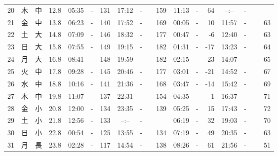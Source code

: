 \documentclass[12pt.a4j]{jsarticle}
\begin{document}
\begin{center}
\begin{table}[ht]
\begin{tabular}{|rc|cr|ccrccr|ccrccr|}
20 & 木 & 中 & 12.8 &  05:35 &-& 131  &  17:12 &-& 159  &   11:13 &-&  64  &   --:-- &-&~~~~~ \\
21 & 金 & 中 & 13.8 &  06:23 &-& 140  &  17:52 &-& 169  &   00:05 &-&  10  &   11:57 &-&  63  \\
22 & 土 & 大 & 14.8 &  07:09 &-& 146  &  18:32 &-& 177  &   00:47 &-&  -6  &   12:40 &-&  63  \\
23 & 日 & 大 & 15.8 &  07:55 &-& 149  &  19:15 &-& 182  &   01:31 &-& -17  &   13:23 &-&  64  \\
24 & 月 & 大 & 16.8 &  08:41 &-& 148  &  19:59 &-& 182  &   02:15 &-& -23  &   14:07 &-&  65  \\
25 & 火 & 中 & 17.8 &  09:28 &-& 145  &  20:46 &-& 177  &   03:01 &-& -21  &   14:52 &-&  67  \\
26 & 水 & 中 & 18.8 &  10:16 &-& 141  &  21:36 &-& 168  &   03:47 &-& -14  &   15:42 &-&  69  \\
27 & 木 & 中 & 19.8 &  11:07 &-& 137  &  22:31 &-& 154  &   04:35 &-&  -1  &   16:37 &-&  71  \\
28 & 金 & 小 & 20.8 &  12:00 &-& 134  &  23:35 &-& 139  &   05:25 &-&  15  &   17:43 &-&  72  \\
29 & 土 & 小 & 21.8 &  12:56 &-& 133  &  --:-- &-&~~~~~ &   06:19 &-&  32  &   19:03 &-&  70  \\
30 & 日 & 小 & 22.8 &  00:54 &-& 125  &  13:55 &-& 134  &   07:19 &-&  49  &   20:35 &-&  63  \\
31 & 月 & 長 & 23.8 &  02:28 &-& 117  &  14:54 &-& 138  &   08:26 &-&  61  &   21:56 &-&  51  \\
   \hline
   \end{tabular}
\end{table}
\newpage
\end{center}
\end{document}
